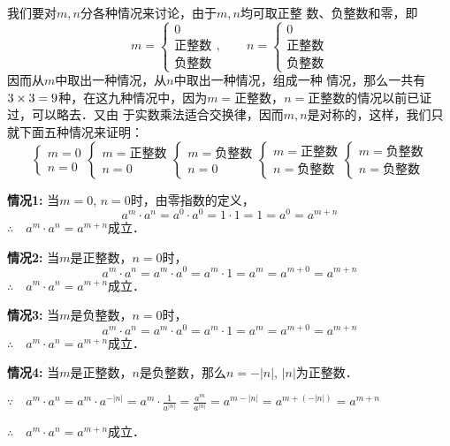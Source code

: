 我们要对$m,n$分各种情况来讨论，由于$m,n$均可取正整
数、负整数和零，即
\[m=\begin{cases}
    0\\ \text{正整数}\\ \text{负整数}
\end{cases},\qquad n=\begin{cases}
    0\\ \text{正整数}\\ \text{负整数}
\end{cases}  \]
因而从$m$中取出一种情况，从$n$中取出一种情况，组成一种
情况，那么一共有$3\times3=9$种，在这九种情况中，因为$m
=$正整数，$n=$正整数的情况以前已证过，可以略去．又由
于实数乘法适合交换律，因而$m,n$是对称的，这样，我们只
就下面五种情况来证明：
\[\begin{cases}
    m=0\\n=0
\end{cases}\begin{cases}
    m=\text{正整数}\\n=0
\end{cases}\begin{cases}
    m=\text{负整数}\\n=0
\end{cases}\begin{cases}
m=\text{正整数}\\  n=\text{负整数}
\end{cases}\begin{cases}
    m=\text{负整数}\\  n=\text{负整数}
\end{cases}  \]

\textbf{情况1:} 当$m=0$, $n=0$时，由零指数的定义，
\[a^m\cdot a^n=a^0\cdot a^0=1\cdot 1=1=a^0=a^{m+n} \]
$\therefore\quad a^m\cdot a^n=a^{m+n}$成立．

\textbf{情况2:} 当$m$是正整数，$n=0$时，
\[a^m\cdot a^n=a^m\cdot a^0=a^m\cdot 1=a^m=a^{m+0}=a^{m+n}\]
$\therefore\quad a^m\cdot a^n=a^{m+n}$成立．


\textbf{情况3:} 当$m$是负整数，$n=0$时，
\[a^m\cdot a^n=a^m\cdot a^0=a^m\cdot 1=a^m=a^{m+0}=a^{m+n}\]
$\therefore\quad a^m\cdot a^n=a^{m+n}$成立．

\textbf{情况4:} 当$m$是正整数，$n$是负整数，那么$n=-|n|$, $|n|$为正整数．

$\because\quad a^m\cdot a^n=a^m\cdot a^{-|n|}=a^m\cdot\frac{1}{a^{|n|} }=\frac{a^m}{a^{|n|}}=a^{m-|n|}=a^{m+(-|n|)}=a^{m+n} $

$\therefore\quad a^m\cdot a^n=a^{m+n}$成立．

